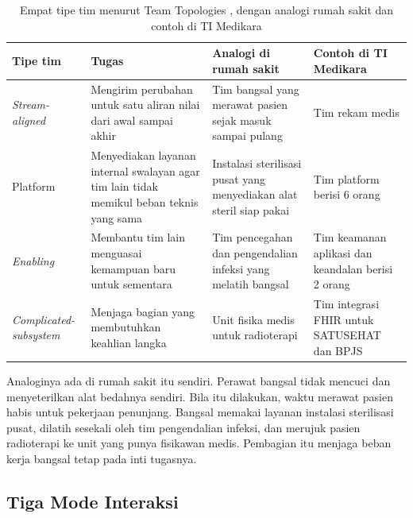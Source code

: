\begin{table}[!htb]
  \centering
  \caption{Empat tipe tim menurut Team Topologies \cite{skelton2025}, dengan analogi rumah sakit
           dan contoh di TI Medikara}
  \label{tab:ch13-tipe-tim}
  \footnotesize
  \begin{tabularx}{\textwidth}{>{\raggedright\arraybackslash}p{2.4cm} >{\raggedright\arraybackslash}X >{\raggedright\arraybackslash}X >{\raggedright\arraybackslash}X}
    \hline
    \textbf{Tipe tim} & \textbf{Tugas} & \textbf{Analogi di rumah sakit} & \textbf{Contoh di TI
      Medikara} \\ \hline
    \textit{Stream-aligned} & Mengirim perubahan untuk satu aliran nilai dari awal sampai akhir &
      Tim bangsal yang merawat pasien sejak masuk sampai pulang & Tim rekam medis \\ \hline
    Platform & Menyediakan layanan internal swalayan agar tim lain tidak memikul beban teknis
      yang sama & Instalasi sterilisasi pusat yang menyediakan alat steril siap pakai & Tim
      platform berisi 6 orang \\ \hline
    \textit{Enabling} & Membantu tim lain menguasai kemampuan baru untuk sementara & Tim
      pencegahan dan pengendalian infeksi yang melatih bangsal & Tim keamanan aplikasi dan
      keandalan berisi 2 orang \\ \hline
    \textit{Complicated-subsystem} & Menjaga bagian yang membutuhkan keahlian langka & Unit
      fisika medis untuk radioterapi & Tim integrasi FHIR untuk SATUSEHAT dan BPJS \\ \hline
  \end{tabularx}
\end{table}

Analoginya ada di rumah sakit itu sendiri. Perawat bangsal tidak mencuci dan menyeterilkan alat
bedahnya sendiri. Bila itu dilakukan, waktu merawat pasien habis untuk pekerjaan penunjang. Bangsal
memakai layanan instalasi sterilisasi pusat, dilatih sesekali oleh tim pengendalian infeksi, dan
merujuk pasien radioterapi ke unit yang punya fisikawan medis. Pembagian itu menjaga beban kerja
bangsal tetap pada inti tugasnya.

\subsection{Tiga Mode Interaksi}

